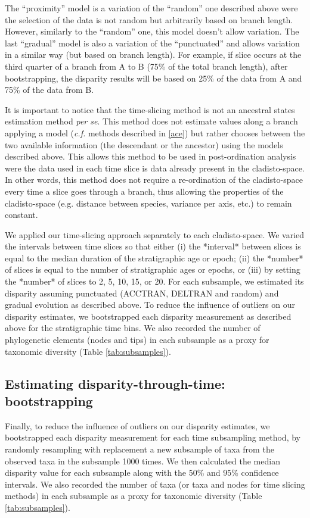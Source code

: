 \documentclass[12pt,a4paper]{article}
\begin{document}
\begin{enumerate}
    The ``proximity'' model is a variation of the ``random'' one described above were the selection of the data is not random but arbitrarily based on branch length.
    However, similarly to the ``random'' one, this model doesn't allow variation.
    The last ``gradual'' model is also a variation of the ``punctuated'' and allows variation in a similar way (but based on branch length).
    For example, if slice occurs at the third quarter of a branch from A to B (75\% of the total branch length), after bootstrapping, the disparity results will be based on 25\% of the data from A and 75\% of the data from B.
\end{enumerate}

It is important to notice that the time-slicing method is not an ancestral states estimation method \textit{per se}.
This method does not estimate values along a branch applying a model (\textit{c.f.} methods described in \ref{ace}) but rather chooses between the two available information (the descendant or the ancestor) using the models described above.
This allows this method to be used in post-ordination analysis were the data used in each time slice is data already present in the cladisto-space.
In other words, this method does not require a re-ordination of the cladisto-space every time a slice goes through a branch, thus allowing the properties of the cladisto-space (e.g. distance between species, variance per axis, etc.) to remain constant.


We applied our time-slicing approach separately to each cladisto-space.
We varied the intervals between time slices so that either (i) the *interval* between slices is equal to the median duration of the stratigraphic age or epoch; (ii) the *number* of slices is equal to the number of stratigraphic ages or epochs, or (iii) by setting the *number* of slices to 2, 5, 10, 15, or 20.
For each subsample, we estimated its disparity assuming punctuated (ACCTRAN, DELTRAN and random) and gradual evolution as described above. %
To reduce the influence of outliers on our disparity estimates, we bootstrapped each disparity measurement as described above for the stratigraphic time bins. 
We also recorded the number of phylogenetic elements (nodes and tips) in each subsample as a proxy for taxonomic diversity (Table \ref{tab:subsamples}).


\subsection{Estimating disparity-through-time: bootstrapping}
Finally, to reduce the influence of outliers on our disparity estimates, we bootstrapped each disparity measurement for each time subsampling method, by randomly resampling with replacement a new subsample of taxa from the observed taxa in the subsample 1000 times.
We then calculated the median disparity value for each subsample along with the 50\% and 95\% confidence intervals.
We also recorded the number of taxa (or taxa and nodes for time slicing methods) in each subsample as a proxy for taxonomic diversity (Table \ref{tab:subsamples}).
\end{document}
